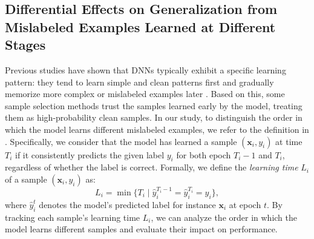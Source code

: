 \subsection{Differential Effects on Generalization from Mislabeled Examples Learned at Different Stages}
\label{sec2.1}
Previous studies have shown that DNNs typically exhibit a specific learning pattern: they tend to learn simple and clean patterns first and gradually memorize more complex or mislabeled examples later \cite{arpit2017closer, toneva2018empirical}. Based on this, some sample selection methods \cite{liu2020early, bai2021me} trust the samples learned early by the model, treating them as high-probability clean samples.
In our study, to distinguish the order in which the model learns different mislabeled examples, we refer to the definition in \citet{yuan2023late}. Specifically, we consider that the model has learned a sample $(\mathbf{x}_i, y_i)$ at time $T_i$ if it consistently predicts the given label $y_i$ for both epoch $T_i-1$ and $T_i$, regardless of whether the label is correct. Formally, we define the \emph{learning time} $L_i$ of a sample $(\mathbf{x}_i, y_i)$ as:
\begin{equation}
L_i = \min \{ T_i \mid \hat{y}_i^{T_i-1} = \hat{y}_i^{T_i} = y_i \},
\label{eq1}
\end{equation}
where $\hat{y}_i^t$ denotes the model's predicted label for instance $\mathbf{x}_i$ at epoch $t$. By tracking each sample's learning time $L_i$, we can analyze the order in which the model learns different samples and evaluate their impact on performance.


